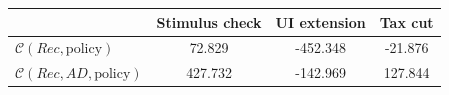 \begin{tabular}{@{}lccc@{}} 
\toprule 
                          & Stimulus check      & UI extension    & Tax cut    \\  \midrule 
$\mathcal{C}(Rec,\text{policy})$ & 72.829  & -452.348  & -21.876     \\ 
$\mathcal{C}(Rec, AD,\text{policy})$ & 427.732  & -142.969  & 127.844     \\ 
\end{tabular}  
